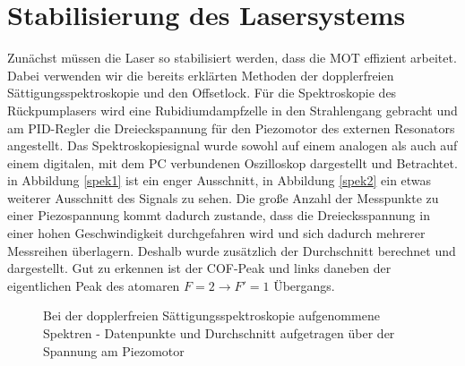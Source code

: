 \documentclass[twoside,colorback,accentcolor=tud4c,11pt]{tudreport}
\begin{document}
\section{Stabilisierung des Lasersystems}
Zunächst müssen die Laser so stabilisiert werden, dass die MOT effizient arbeitet. Dabei verwenden wir die bereits erklärten Methoden der dopplerfreien Sättigungsspektroskopie und den Offsetlock. Für die Spektroskopie des Rückpumplasers wird eine Rubidiumdampfzelle in den Strahlengang gebracht und am PID-Regler die Dreieckspannung für den Piezomotor des externen Resonators angestellt. Das Spektroskopiesignal wurde sowohl auf einem analogen als auch auf einem digitalen, mit dem PC verbundenen Oszilloskop dargestellt und Betrachtet. in Abbildung \ref{spek1} ist ein enger Ausschnitt, in Abbildung \ref{spek2} ein etwas weiterer Ausschnitt des Signals zu sehen. Die große Anzahl der Messpunkte zu einer Piezospannung kommt dadurch zustande, dass die Dreiecksspannung in einer hohen Geschwindigkeit durchgefahren wird und sich dadurch mehrerer Messreihen überlagern. Deshalb wurde zusätzlich der Durchschnitt berechnet und dargestellt. Gut zu erkennen ist der COF-Peak und links daneben der eigentlichen Peak des atomaren $F=2\rightarrow F'=1$ Übergangs.
\begin{figure}[H]
  \centering
  \quad
  \quad
  \caption{Bei der dopplerfreien Sättigungsspektroskopie aufgenommene Spektren - Datenpunkte und Durchschnitt aufgetragen über der Spannung am Piezomotor}
  \label{spektren}
\end{figure}
\end{document}
